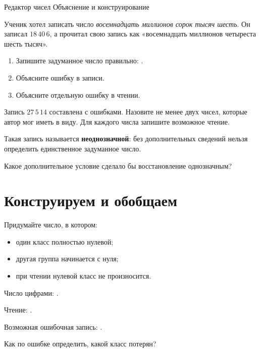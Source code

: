 \worksheettitle
  {Редактор чисел}
  { Объяснение и конструирование}

\studentnameblock

\begin{warningbox}
  Ученик хотел записать число
  \emph{восемнадцать миллионов сорок тысяч шесть}. Он записал
  \(18\,40\,6\), а прочитал свою запись как «восемнадцать миллионов четыреста
  шесть тысяч».

  \begin{enumerate}[label=\textbf{\arabic*.}]
    \item Запишите задуманное число правильно: \answerblank[48mm].
    \item Объясните ошибку в записи.
    \item Объясните отдельную ошибку в чтении.
  \end{enumerate}
\end{warningbox}

\begin{practicebox}
  Запись \(27\,5\,14\) составлена с ошибками. Назовите не менее двух чисел,
  которые автор мог иметь в виду. Для каждого числа запишите возможное чтение.

  Такая запись называется \textbf{неоднозначной}: без дополнительных сведений
  нельзя определить единственное задуманное число.

  Какое дополнительное условие сделало бы восстановление однозначным?
\end{practicebox}

\newpage
\section{Конструируем и обобщаем}

\begin{practicebox}
  Придумайте число, в котором:
  \begin{itemize}
    \item один класс полностью нулевой;
    \item другая группа начинается с нуля;
    \item при чтении нулевой класс не произносится.
  \end{itemize}
  Число цифрами: \answerblank[58mm].

  Чтение: \answerblank[105mm].

  Возможная ошибочная запись: \answerblank[58mm].

  Как по ошибке определить, какой класс потерян?
\end{practicebox}

